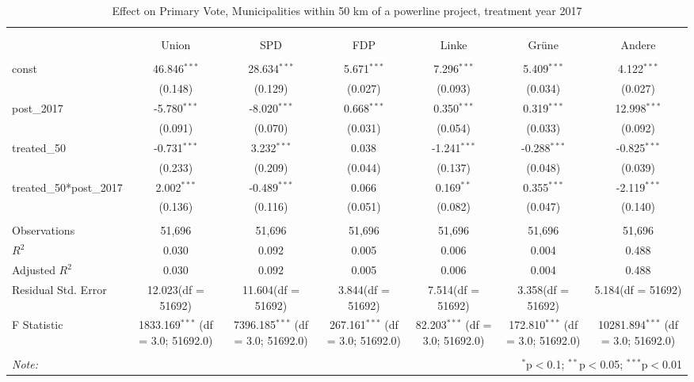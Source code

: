 \documentclass[12pt]{article}
\begin{document}
\begin{table}[!htbp] \centering
  \caption{Effect on Primary Vote, Municipalities within 50 km of a powerline project, treatment year 2017}
\begin{tabular}{@{\extracolsep{5pt}}lcccccc}
\\[-1.8ex]\hline
\hline \\[-1.8ex]
\\[-1.8ex] & \multicolumn{1}{c}{Union} & \multicolumn{1}{c}{SPD} & \multicolumn{1}{c}{FDP} & \multicolumn{1}{c}{Linke} & \multicolumn{1}{c}{Grüne} & \multicolumn{1}{c}{Andere}  \\
\hline \\[-1.8ex]
 const & 46.846$^{***}$ & 28.634$^{***}$ & 5.671$^{***}$ & 7.296$^{***}$ & 5.409$^{***}$ & 4.122$^{***}$ \\
  & (0.148) & (0.129) & (0.027) & (0.093) & (0.034) & (0.027) \\
 post_2017 & -5.780$^{***}$ & -8.020$^{***}$ & 0.668$^{***}$ & 0.350$^{***}$ & 0.319$^{***}$ & 12.998$^{***}$ \\
  & (0.091) & (0.070) & (0.031) & (0.054) & (0.033) & (0.092) \\
 treated_50 & -0.731$^{***}$ & 3.232$^{***}$ & 0.038$^{}$ & -1.241$^{***}$ & -0.288$^{***}$ & -0.825$^{***}$ \\
  & (0.233) & (0.209) & (0.044) & (0.137) & (0.048) & (0.039) \\
 treated_50*post_2017 & 2.002$^{***}$ & -0.489$^{***}$ & 0.066$^{}$ & 0.169$^{**}$ & 0.355$^{***}$ & -2.119$^{***}$ \\
  & (0.136) & (0.116) & (0.051) & (0.082) & (0.047) & (0.140) \\
\hline \\[-1.8ex]
 Observations & 51,696 & 51,696 & 51,696 & 51,696 & 51,696 & 51,696 \\
 $R^2$ & 0.030 & 0.092 & 0.005 & 0.006 & 0.004 & 0.488 \\
 Adjusted $R^2$ & 0.030 & 0.092 & 0.005 & 0.006 & 0.004 & 0.488 \\
 Residual Std. Error & 12.023(df = 51692) & 11.604(df = 51692) & 3.844(df = 51692) & 7.514(df = 51692) & 3.358(df = 51692) & 5.184(df = 51692)  \\
 F Statistic & 1833.169$^{***}$ (df = 3.0; 51692.0) & 7396.185$^{***}$ (df = 3.0; 51692.0) & 267.161$^{***}$ (df = 3.0; 51692.0) & 82.203$^{***}$ (df = 3.0; 51692.0) & 172.810$^{***}$ (df = 3.0; 51692.0) & 10281.894$^{***}$ (df = 3.0; 51692.0) \\
\hline
\hline \\[-1.8ex]
\textit{Note:} & \multicolumn{6}{r}{$^{*}$p$<$0.1; $^{**}$p$<$0.05; $^{***}$p$<$0.01} \\
\end{tabular}
\end{table}
\end{document}
